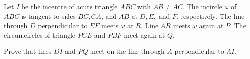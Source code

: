 Let $I$ be the incentre of acute triangle $ABC$ with $AB\neq AC$. The incircle $\omega$ of $ABC$ is tangent to sides $BC, CA$, and $AB$ at $D, E,$ and $F$, respectively. The line through $D$ perpendicular to $EF$ meets $\omega$ at $R$. Line $AR$ meets $\omega$ again at $P$. The circumcircles of triangle $PCE$ and $PBF$ meet again at $Q$.

Prove that lines $DI$ and $PQ$ meet on the line through $A$ perpendicular to $AI$.

